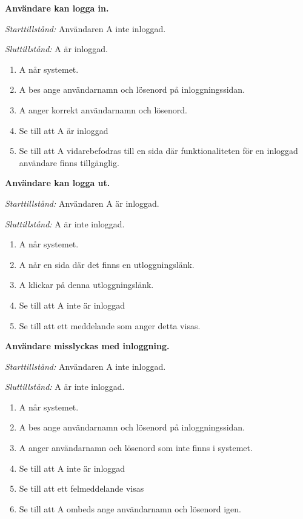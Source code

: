 \documentclass[a4paper]{article}
\begin{document}
\begin{ST}

\item
\textbf{Användare kan logga in.}

\emph{Starttillstånd:} Användaren A inte inloggad.

\emph{Sluttillstånd:} A är inloggad.

\begin{enumerate}
\item A når systemet.
\item A bes ange användarnamn och lösenord på inloggningssidan.
\item A anger korrekt användarnamn och lösenord.
\item Se till att A är inloggad
\item Se till att A vidarebefodras till en sida där funktionaliteten för en inloggad användare finns tillgänglig.
\end{enumerate}

\item
\textbf{Användare kan logga ut.}

\emph{Starttillstånd:} Användaren A är inloggad.

\emph{Sluttillstånd:} A är inte inloggad.

\begin{enumerate}
\item A når systemet.
\item A når en sida där det finns en utloggningslänk.
\item A klickar på denna utloggningslänk.
\item Se till att A inte är inloggad
\item Se till att ett meddelande som anger detta visas.
\end{enumerate}

\item
\textbf{Användare misslyckas med inloggning.}

\emph{Starttillstånd:} Användaren A inte inloggad.

\emph{Sluttillstånd:} A är inte inloggad.

\begin{enumerate}
\item A når systemet.
\item A bes ange användarnamn och lösenord på inloggningssidan.
\item A anger användarnamn och lösenord som inte finns i systemet.
\item Se till att A inte är inloggad
\item Se till att ett felmeddelande visas
\item Se till att A ombeds ange användarnamn och lösenord igen.
\end{enumerate}

\end{ST}
\end{document}
